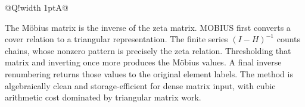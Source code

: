 \documentclass[10pt,letterpaper]{article}
\begin{document}
\begin{longtable}{@{}Q!{\color{Mist}\vrule width 1pt}A@{}}
\end{longtable}
\begin{tcolorbox}[colback=Ink!4,colframe=Ink,title=Cornell summary]
The M\"obius matrix is the inverse of the zeta matrix. MOBIUS first converts a cover relation to a triangular representation. The finite series $(I-H)^{-1}$ counts chains, whose nonzero pattern is precisely the zeta relation. Thresholding that matrix and inverting once more produces the M\"obius values. A final inverse renumbering returns those values to the original element labels. The method is algebraically clean and storage-efficient for dense matrix input, with cubic arithmetic cost dominated by triangular matrix work.
\end{tcolorbox}
\end{document}
